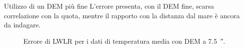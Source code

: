 %     

%     

\begin{frame}{Utilizzo di un DEM più fine}
  L'errore presenta, con il DEM fine, scarsa correlazione con la quota, mentre il rapporto con la distanza dal mare è ancora da indagare.
  \begin{figure}
    \begin{subfigure}{0.45\textwidth}
      

    \end{subfigure}
    \begin{subfigure}{0.45\textwidth}
      
    \end{subfigure}
    \caption*{Errore di LWLR per i dati di temperatura media con DEM a \qty{7.5}{\arcsecond}.}
  \end{figure}
\end{frame}
